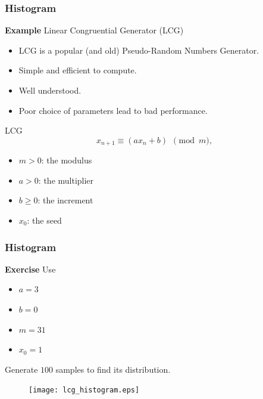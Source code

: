 \documentclass[compress]{beamer}  %
\begin{document}
\begin{frame}[fragile]
\frametitle{Histogram}
\textbf{Example} 
Linear Congruential Generator (LCG)

\begin{itemize}[<+->]
    \item LCG is a popular (and old) Pseudo-Random Numbers Generator.
    \item Simple and efficient to compute.
    \item Well understood.
    \item Poor choice of parameters lead to bad performance.
\end{itemize}
\pause
\begin{block}{LCG}
\begin{equation}
    x_{n+1} \equiv \left( a x_n + b \right)~~\pmod{m},
\end{equation}
\begin{itemize}
    \item $m > 0$: the modulus
    \item $a > 0$: the multiplier
    \item $b \geq 0$: the increment
    \item $x_0$: the seed
\end{itemize}
\end{block}

\end{frame}
\begin{frame}[fragile]
\frametitle{Histogram}
\textbf{Exercise} 
Use
\begin{itemize}
    \item $a = 3$
    \item $b = 0$
    \item $m = 31$
    \item $x_0 = 1$
\end{itemize}
Generate $100$ samples to find its distribution.
\setcounter{subfigure}{0}
\begin{figure}
    \centering
    \texttt{[image: lcg\_histogram.eps]}
\end{figure}

\end{frame}
\end{document}
